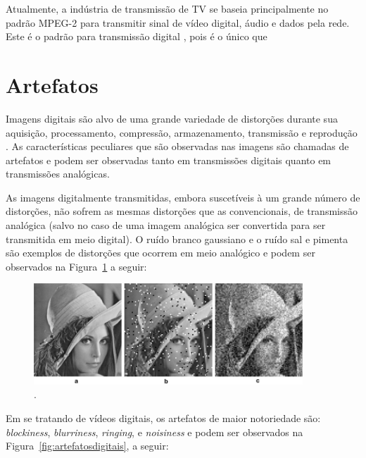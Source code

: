 Atualmente, a indústria de transmissão de TV se baseia principalmente no padrão MPEG-2 para transmitir sinal de vídeo digital, áudio e dados pela rede. Este é o padrão para transmissão digital \cite{mpeg2ref}, pois é o único que 

\section{Artefatos}

Imagens digitais são alvo de uma grande variedade de distorções durante sua aquisição, processamento, compressão, armazenamento, transmissão e reprodução \cite{wangbovik2004}. As características peculiares que são observadas nas imagens são chamadas de artefatos \cite{albini} e podem ser observadas tanto em transmissões digitais quanto em transmissões analógicas.

As imagens digitalmente transmitidas, embora suscetíveis à um grande número de distorções, não sofrem as mesmas distorções que as convencionais, de transmissão analógica (salvo no caso de uma imagem analógica ser convertida para ser transmitida em meio digital). O ruído branco gaussiano e o ruído sal e pimenta são exemplos de distorções que ocorrem em meio analógico e podem ser observados na Figura~\ref{fig:artefatosanalogicos} a seguir:

\begin{figure}[!htb]
	\centering
	\includegraphics[width=0.9\textwidth]{./imgs/artefatosanalogicos.png}
	\caption{.}
	\label{fig:artefatosanalogicos}
\end{figure}

Em se tratando de vídeos digitais, os artefatos de maior notoriedade são: \emph{blockiness}, \emph{blurriness}, \emph{ringing}, e \emph{noisiness} \cite{farias2007} e podem ser observados na Figura~\ref{fig:artefatosdigitais}, a seguir:

